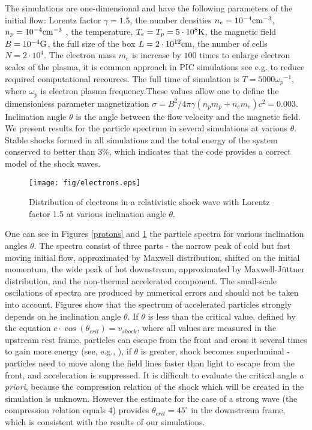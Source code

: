 \documentclass[a4paper]{jpconf}
\begin{document}
The simulations are one-dimensional and have the following parameters of the initial flow: Lorentz factor $\gamma = 1.5$, the number densities $n_e = 10^{-4} \rm{cm}^{-3}$, $n_p = 10^{-4} \rm{cm}^{-3}$ , the temperature, $T_e = T_p = 5\cdot10^8 \rm{K}$, the magnetic field $B = 10^{-4} \rm{G}$, the full size of the box $L = 2\cdot10^{12} \rm{cm}$, the number of cells $N=2\cdot10^4$. The electron mass $m_e$ is increase by $100$ times to enlarge electron scales of  the plasma, it is common approach in PIC simulations see e.g. {\cite{Sironi2011}} to reduce required computational recources. The full time of simulation is $T = 5000 {\omega_p}^{-1}$, where $\omega_p$ is electron plasma frequency.These values allow one to define the dimensionless parameter magnetization $\sigma = B^2/4\pi\gamma (n_p m_p + n_e m_e) c^2 = 0.003$. Inclination angle $\theta$ is the angle between the flow velocity and the magnetic field. We present results for the particle spectrum in several simulations at various $\theta$. Stable shocks formed in all simulations and the total energy of the system conserved to better than $3\%$, which indicates that the code provides a correct model of the shock waves. 


\begin{figure}[h!]
	\centering
	\texttt{[image: fig/electrons.eps]} 
	\caption{Distribution of electrons in a relativistic shock wave with Lorentz factor 1.5 at various inclination angle $\theta$.}
	\label{electrons}
\end{figure}

One can see in Figures \ref{protons} and \ref{electrons} the particle spectra for various inclination angles $\theta$. The spectra consist of three parts - the narrow peak of cold but fast moving initial flow, approximated by Maxwell distribution, shifted on the initial momentum, the wide peak of hot downstream, approximated by Maxwell-J{\"u}ttner distribution, and the non-thermal accelerated component. The small-scale oscilations of spectra are produced by numerical errors and should not be taken into account. Figures show that the spectrum of accelerated particles strongly depends on he inclination angle $\theta$. If $\theta$ is less than the critical value, defined by the equation $c\cdot \cos(\theta_{crit})=v_{shock}$, where all values are measured in the upstream rest frame, particles can escape from the front and cross it several times to gain more energy (see, e.g., \cite{Pelletier2017}), if $\theta$ is greater, shock becomes superluminal - particles need to move along the field lines faster than light to escape from the front, and acceleration is suppressed. It is difficult to evaluate the critical angle \textit{a priori}, because the compression relation of the shock which will be created in the simulation is unknown. However the estimate for the case of a strong wave (the compression relation equals $4$) provides $\theta_{crit}=45^{\circ}$ in the downstream frame, which is consistent with the results of our simulations.
\end{document}
